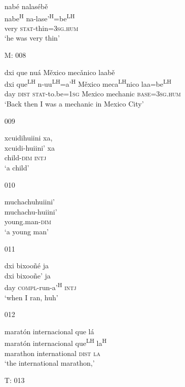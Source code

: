 \begin{itemize}
\glll nab\'{e} nalas\'{e}b\v{e}\\
nabe\textsuperscript{H} na-lase'\textsuperscript{H}=be\textsuperscript{LH} \\
very \textsc{stat}-thin=\textsc{3sg.hum}\\
\glt `he was very thin' 
 

\item[M: 008]
   
\glll dxi que nu\'{a} M\v{e}xico mec\v{a}nico laab\v{e}\\
dxi que\textsuperscript{LH} n-uu\textsuperscript{LH}=a'\textsuperscript{H}  M\v{e}xico meca\textsuperscript{LH}nico laa=be\textsuperscript{LH}\\
day \textsc{dist} \textsc{stat}-to.be=\textsc{1sg} Mexico mechanic \textsc{base}=\textsc{3sg.hum} \\
\glt `Back then I was a mechanic in Mexico City'
 

\item[009]
   
\glll xcuidihuiini xa,\\
xcuidi-huiini' xa \\
child-\textsc{dim} \textsc{intj}\\
\glt `a child'
 

\item[010]
   
\glll muchachuhuiini'\\
muchachu-huiini' \\
young.man-\textsc{dim} \\
\glt `a young man'
 

\item[011]
  
\glll dxi bixoo\~{n}\'{e} ja\\
dxi bixoo\~{n}e' ja\\
day \textsc{compl}-run-a'\textsuperscript{H} \textsc{intj}\\
\glt `when I ran, huh'
 

\item[012]
  
\glll marat\'{o}n internacional que l\'{a}\\
marat\'{o}n internacional que\textsuperscript{LH} la\textsuperscript{H}\\
marathon	international \textsc{dist} \textsc{la}\\
\glt `the international marathon,'
 

\item[T: 013]
    

\end{itemize}

